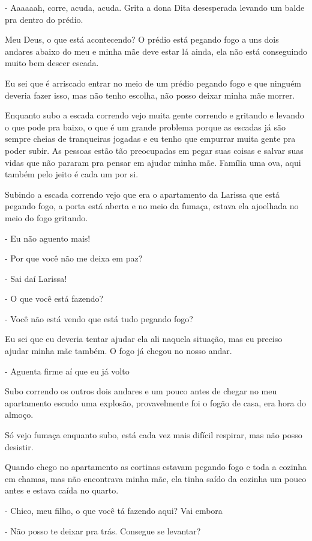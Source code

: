 - Aaaaaah, corre, acuda, acuda. Grita a dona Dita desesperada levando um balde pra dentro do prédio.

Meu Deus, o que está acontecendo? O prédio está pegando fogo a uns dois andares abaixo do meu e minha mãe deve estar lá ainda, ela não está conseguindo muito bem descer escada.

Eu sei que é arriscado entrar no meio de um prédio pegando fogo e que ninguém deveria fazer isso, mas não tenho escolha, não posso deixar minha mãe morrer.

Enquanto subo a escada correndo vejo muita gente correndo e gritando e levando o que pode pra baixo, o que é um grande problema porque as escadas já são sempre cheias de tranqueiras jogadas e eu tenho que empurrar muita gente pra poder subir. As pessoas estão tão preocupadas em pegar suas coisas e salvar suas vidas que não pararam pra pensar em ajudar minha mãe. Família uma ova, aqui também pelo jeito é cada um por si.

Subindo a escada correndo vejo que era o apartamento da Larissa que está pegando fogo, a porta está aberta e no meio da fumaça, estava ela ajoelhada no meio do fogo gritando.

- Eu não aguento mais!

- Por que você não me deixa em paz?

- Sai daí Larissa!

- O que você está fazendo?

- Você não está vendo que está tudo pegando fogo?

Eu sei que eu deveria tentar ajudar ela ali naquela situação, mas eu preciso ajudar minha mãe também. O fogo já chegou no nosso andar.

- Aguenta firme aí que eu já volto

Subo correndo os outros dois andares e um pouco antes de chegar no meu apartamento escudo uma explosão, provavelmente foi o fogão de casa, era hora do almoço.

Só vejo fumaça enquanto subo, está cada vez mais difícil respirar, mas não posso desistir.

Quando chego no apartamento as cortinas estavam pegando fogo e toda a cozinha em chamas, mas não encontrava minha mãe, ela tinha saído da cozinha um pouco antes e estava caída no quarto.

- Chico, meu filho, o que você tá fazendo aqui? Vai embora

- Não posso te deixar pra trás. Consegue se levantar?

